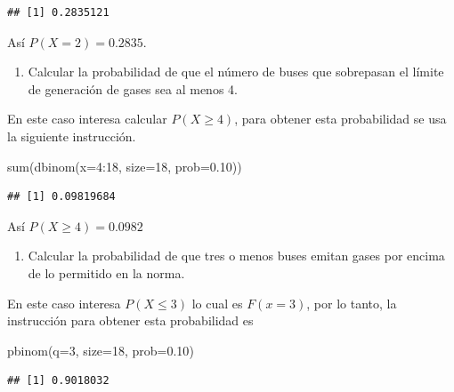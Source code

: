 \documentclass[
]{book}
\makeatletter
\newenvironment{Shaded}{\begin{snugshade}}{\end{snugshade}}
\newcommand{\AttributeTok}[1]{\textcolor[rgb]{0.77,0.63,0.00}{#1}}
\newcommand{\DecValTok}[1]{\textcolor[rgb]{0.00,0.00,0.81}{#1}}
\newcommand{\FloatTok}[1]{\textcolor[rgb]{0.00,0.00,0.81}{#1}}
\newcommand{\FunctionTok}[1]{\textcolor[rgb]{0.00,0.00,0.00}{#1}}
\newcommand{\NormalTok}[1]{#1}
\newcommand{\SpecialCharTok}[1]{\textcolor[rgb]{0.00,0.00,0.00}{#1}}
\providecommand{\tightlist}{%
  \setlength{\itemsep}{0pt}\setlength{\parskip}{0pt}}
\newenvironment{kframe}{%
\medskip{}
\setlength{\fboxsep}{.8em}
 \def\at@end@of@kframe{}%
 \ifinner\ifhmode%
  \def\at@end@of@kframe{\end{minipage}}%
  \begin{minipage}{\columnwidth}%
 \fi\fi%
 \def\FrameCommand##1{\hskip\@totalleftmargin \hskip-\fboxsep
 \colorbox{shadecolor}{##1}\hskip-\fboxsep
     \hskip-\linewidth \hskip-\@totalleftmargin \hskip\columnwidth}%
 \MakeFramed {\advance\hsize-\width
   \@totalleftmargin\z@ \linewidth\hsize
   \@setminipage}}%
 {\par\unskip\endMakeFramed%
 \at@end@of@kframe}
\renewenvironment{Shaded}{\begin{kframe}}{\end{kframe}}
\makeatother
\begin{document}
\begin{verbatim}
## [1] 0.2835121
\end{verbatim}

Así \(P(X=2)=0.2835\).

\begin{enumerate}
\def\labelenumi{\arabic{enumi})}
\setcounter{enumi}{1}
\tightlist
\item
  Calcular la probabilidad de que el número de buses que sobrepasan el límite de generación de gases sea al menos 4.
\end{enumerate}

En este caso interesa calcular \(P(X \geq 4)\), para obtener esta probabilidad se usa la siguiente instrucción.

\begin{Shaded}
\begin{Highlighting}[]
\FunctionTok{sum}\NormalTok{(}\FunctionTok{dbinom}\NormalTok{(}\AttributeTok{x=}\DecValTok{4}\SpecialCharTok{:}\DecValTok{18}\NormalTok{, }\AttributeTok{size=}\DecValTok{18}\NormalTok{, }\AttributeTok{prob=}\FloatTok{0.10}\NormalTok{))}
\end{Highlighting}
\end{Shaded}

\begin{verbatim}
## [1] 0.09819684
\end{verbatim}

Así \(P(X \geq 4)=0.0982\)

\begin{enumerate}
\def\labelenumi{\arabic{enumi})}
\setcounter{enumi}{2}
\tightlist
\item
  Calcular la probabilidad de que tres o menos buses emitan gases por encima de lo permitido en la norma.
\end{enumerate}

En este caso interesa \(P(X\leq3)\) lo cual es \(F(x=3)\), por lo tanto, la instrucción para obtener esta probabilidad es

\begin{Shaded}
\begin{Highlighting}[]
\FunctionTok{pbinom}\NormalTok{(}\AttributeTok{q=}\DecValTok{3}\NormalTok{, }\AttributeTok{size=}\DecValTok{18}\NormalTok{, }\AttributeTok{prob=}\FloatTok{0.10}\NormalTok{)}
\end{Highlighting}
\end{Shaded}

\begin{verbatim}
## [1] 0.9018032
\end{verbatim}
\end{document}
